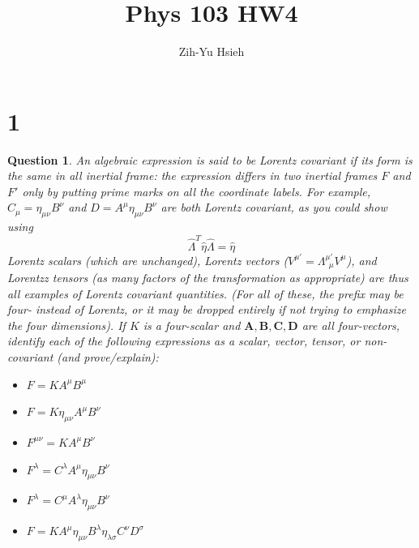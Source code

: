 \documentclass{article}
\title{Phys 103 HW4}
\author{Zih-Yu Hsieh}
\newtheorem{question}{Question}
\begin{document}
\maketitle

\section*{1}
\begin{question}\label{q1}
    An algebraic expression is said to be \emph{Lorentz covariant} if its form is the same in all inertial frame: the expression differs in two inertial frames $F$ and $F'$ only by putting prime marks on all the coordinate labels. For example, $C_\mu = \eta_{\mu\nu}B^\nu$ and $D=A^\mu \eta_{\mu\nu}B^{\nu}$ are both Lorentz covariant, as you could show using 
    $$\hat{\Lambda}^T\hat{\eta}\hat{\Lambda}=\hat{\eta}$$
    Lorentz scalars (which are unchanged), Lorentz vectors ($V^{\mu'} = \Lambda^{\mu'}_{\ \ \mu}V^\mu$), and Lorentzz tensors (as many factors of the transformation as appropriate) are thus all examples of Lorentz covariant quantities. (For all of these, the prefix may be \emph{four-} instead of Lorentz, or it may be dropped entirely if not trying to emphasize the four dimensions). If $K$ is a four-scalar and $\textbf{A},\textbf{B},\textbf{C},\textbf{D}$ are all four-vectors, identify each of the following expressions as a scalar, vector, tensor, or non-covariant (and prove/explain):
    \begin{itemize}
        \item $F=KA^\mu B^\mu$
        \item $F=K \eta_{\mu\nu}A^\mu B^\nu$
        \item $F^{\mu\nu} = KA^\mu B^\nu$
        \item $F^\lambda = C^\lambda A^\mu \eta_{\mu\nu}B^\nu$
        \item $F^\lambda = C^\mu A^\lambda \eta_{\mu\nu}B^\nu$
        \item $F=KA^\mu \eta_{\mu\nu}B^\lambda \eta_{\lambda\sigma}C^\nu D^\sigma$
    \end{itemize}
\end{question}
\end{document}
